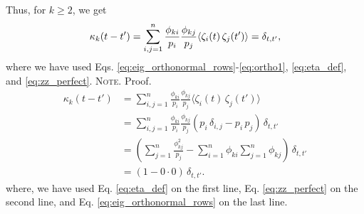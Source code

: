 \documentclass[reprint, floatfix]{revtex4-1}
\newcommand{\note}[1]{{\color{DarkGreen}\footnotesize \textsc{Note.} #1}}
\begin{document}
%
Thus,
for $k \ge 2$, we get
%
\begin{equation}
  \kappa_k(t - t')
  =
  \sum_{i,j = 1}^n
  \frac{ \phi_{ki} } { p_i }
  \frac{ \phi_{kj} } { p_j }
  \langle \zeta_i(t) \, \zeta_j(t') \rangle
  = \delta_{t, t'},
\notag
\end{equation}
%
where we have used
Eqs. \eqref{eq:eig_orthonormal_rows}-\eqref{eq:ortho1},
\eqref{eq:eta_def},
and
\eqref{eq:zz_perfect}.
%
\note{Proof.%
  $$
  \begin{aligned}
  \kappa_k(t - t')
  &=
  \sum_{i,j = 1}^n
  \frac{ \phi_{ki} } { p_i }
  \frac{ \phi_{kj} } { p_j }
  \langle \zeta_i(t) \, \zeta_j(t') \rangle
  \\
  &=
  \sum_{i,j = 1}^n
  \frac{ \phi_{ki} } { p_i }
  \frac{ \phi_{kj} } { p_j }
  \left(
    p_i \, \delta_{i, j} - p_i \, p_j
  \right)
  \, \delta_{t, t'}
  \\
  &=
  \left(
    \sum_{j = 1}^n
    \frac{ \phi_{kj}^2 } { p_j }
    -
    \sum_{i = 1}^n \phi_{ki}
    \sum_{j = 1}^n \phi_{kj}
  \right)
  \, \delta_{t, t'}
  \\
  &=
  (1 - 0 \cdot 0) \, \delta_{t, t'}.
  \end{aligned}
  $$
  where,
  we have used
  Eq. \eqref{eq:eta_def}
  on the first line,
  Eq. \eqref{eq:zz_perfect}
  on the second line,
  and
  Eq. \eqref{eq:eig_orthonormal_rows}
  on the last line.
}
\end{document}
